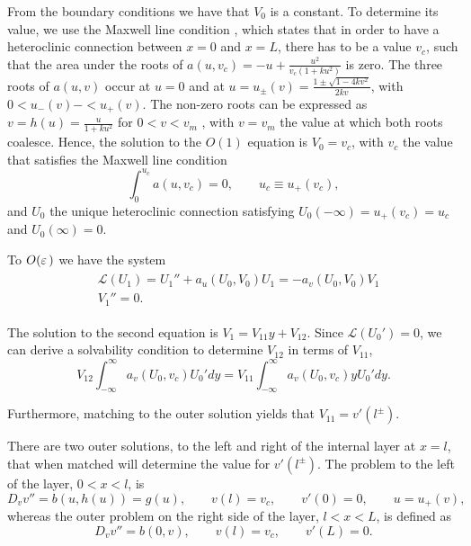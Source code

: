 From the boundary conditions we have that $V_0$ is a constant. To determine its value, we use the Maxwell line condition \cite{maxwell1994}, which states that in order to have a heteroclinic connection between $x=0$ and $x=L$, there has to be a value $v_c$, such that the area under the roots of $a(u,v_c) = -u +  \frac{u^2}{v_c(1+ku^2)}$ is zero. The three roots of $a(u,v)$ occur at $u=0$ and at $u=u_{\pm}(v) = \frac{1\pm\sqrt{1-4kv^2}}{2kv}$, with $0<u_-(v)-<u_+(v)$. The non-zero roots can be expressed as $v=h(u)=\frac{u}{1+ku^2}$ for $0<v<v_m$ , with $v=v_m$ the value at which both roots coalesce. Hence, the solution to the $O(1)$ equation is $V_0=v_c$, with $v_c$ the value that satisfies the Maxwell line condition
% 
\begin{equation}
\label{eqn:maxwell}
\int_0^{u_c}a(u,v_c)=0,\qquad u_c\equiv u_+(v_c),
\end{equation}
% 
and $U_0$ the unique heteroclinic connection satisfying $U_0(-\infty)=u_+(v_c)=u_c$ and $U_0(\infty)=0$.

To $O(\varepsilon\,)$ we have the system
% 
\begin{equation*}
\label{eqn:order_eps}
\begin{split}
\begin{aligned}
	&\mathcal{L}(U_1) = U_1'' + a_u(U_0,V_0)U_1 = -a_v(U_0,V_0)V_1\\
	&V_1'' = 0.
\end{aligned}
\end{split}
\end{equation*}

The solution to the second equation is $V_1 = V_{11}y + V_{12}$. Since $\mathcal{L}(U_0')=0$, we can derive a solvability condition to determine $V_{12}$ in terms of $V_{11}$,
% 
\begin{equation*}
  \label{eqn:solvability}
  V_{12}\int_{-\infty}^{\infty}a_v(U_0,v_c)U_0'dy = V_{11}\int_{-\infty}^{\infty}a_v(U_0,v_c)yU_0'dy.
\end{equation*}

Furthermore, matching to the outer solution yields that $V_{11} = v'(l^{\pm})$.

There are two outer solutions, to the left and right of the internal layer at $x=l$, that when matched will determine the value for $v'(l^{\pm})$. The problem to the left of the layer, $0<x<l$, is
% 
\begin{equation}
  \label{eqn:left}
  D_v v'' = b(u,h(u)) = g(u),\qquad v(l)=v_c,\qquad v'(0)=0,\qquad u = u_+(v),
\end{equation}
% 
whereas the outer problem on the right side of the layer, $l<x<L$, is defined as
% 
\begin{equation}
  \label{eqn:right}
  D_v v'' = b(0,v),\qquad v(l)=v_c,\qquad v'(L)=0.
\end{equation}

